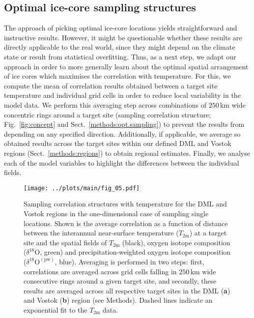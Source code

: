 \documentclass[cp, manuscript]{copernicus}
\begin{document}
\subsection{Optimal ice-core sampling structures}
\label{results:optim-spacing}

The approach of picking optimal ice-core locations yields straightforward and
instructive results. However, it might be questionable whether these results are
directly applicable to the real world, since they might depend on the climate
state or result from statistical overfitting. Thus, as a next step, we adapt our
approach in order to more generally learn about the optimal spatial arrangement
of ice cores which maximises the correlation with temperature. For this, we
compute the mean of correlation results obtained between a target site
temperature and individual grid cells in order to reduce local variability in
the model data. We perform this averaging step across combinations of $250$\,km
wide concentric rings around a target site (sampling correlation structure;
Fig.~\ref{fig:concept} and Sect.~\ref{methods:opt.sampling}) to prevent the
results from depending on any specified direction. Additionally, if applicable,
we average so obtained results across the target sites within our defined DML
and Vostok regions (Sect.~\ref{methods:regions}) to obtain regional
estimates. Finally, we analyse each of the model variables to highlight the
differences between the individual fields.

\begin{figure*}[t]%
\centering
\texttt{[image: ../plots/main/fig\_05.pdf]}
\caption{%
  Sampling correlation structures with temperature for the DML and Vostok
  regions in the one-dimensional case of sampling single locations. Shown is the
  average correlation as a function of distance between the interannual
  near-surface temperature ($T_{2\mathrm{m}}$) at a target site and the spatial
  fields of $T_{2\mathrm{m}}$ (black), oxygen isotope composition
  ($\delta^{18}\mathrm{O}$, green) and precipitation-weighted oxygen isotope
  composition ($\delta^{18}\mathrm{O}^{\mathrm{(pw)}}$, blue). Averaging is
  performed in two steps: first, correlations are averaged across grid cells
  falling in $250$\,km wide consecutive rings around a given target site, and
  secondly, these results are averaged across all respective target sites in the
  DML (\textbf{a}) and Vostok (\textbf{b}) region (see Methods). Dashed lines
  indicate an exponential fit to the $T_{2\mathrm{m}}$ data.}
\label{fig:avg.cor.structure}%
\end{figure*}%
\end{document}
